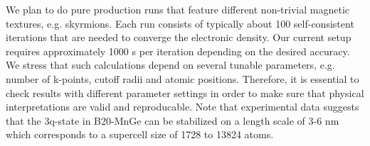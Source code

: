 \documentclass [a4paper, 12pt]{article}
\begin{document}

We plan to do pure production runs that feature different non-trivial magnetic textures, e.g. skyrmions.
Each run consists of typically about 100 self-consistent iterations that are needed to converge
the electronic density. Our current setup requires approximately 1000 s per iteration depending on the desired
accuracy. We stress that such calculations depend on several tunable parameters, e.g. number of
k-points, cutoff radii and atomic positions. Therefore, it is essential to check results with different parameter
settings in order to make sure that physical interpretations are valid and reproducable. 
Note that
experimental data suggests that the 3q-state in B20-MnGe can be stabilized on a length scale 
of 3-6 nm which corresponds to a supercell size of
1728 to 13824 atoms.



\bigskip
\end{document}
